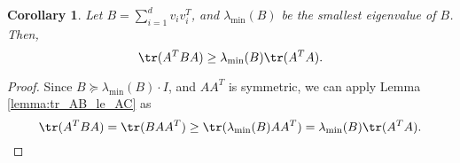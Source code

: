 \documentclass[nobib]{my-handout}
\newtheorem{corollary}{Corollary}
\begin{document}
\begin{corollary}
	Let $B = \sum_{i=1}^d v_i v_i^T$, and $\lambda_{\min}(B)$ be the smallest
	eigenvalue of $B$. Then,
	\[ \tr(A^T B A) \ge \lambda_{\min}(B) \tr(A^T A). \]
\end{corollary}

\begin{proof}
	Since $B \succeq \lambda_{\min}(B) \cdot I$, and $A A^T$ is symmetric, we can
	apply Lemma \ref{lemma:tr_AB_le_AC} as
	\[ \tr(A^T B A) = \tr(B A A^T) \ge \tr(\lambda_{\min}(B) A A^T) =
	\lambda_{\min}(B) \tr(A^T A). \]
\end{proof}





\end{document}
